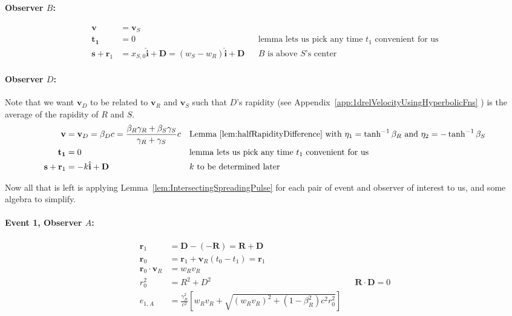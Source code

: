 \documentclass[a4paper]{article}
\theoremstyle{plain}
\theoremstyle{definition}
\newcommand{\vect}[1]{\mathbf{#1}}
\newcommand{\hatvec}[1]{\hat{\mathbf{#1}}}
\begin{document}
\paragraph{Observer $B$:}

\begin{align}
\vect{v} & = \vect{v}_S \\
\vect{t_1} & = 0 & & \text{lemma lets us pick any time $t_1$ convenient for us} \\
\vect{s} + \vect{r}_1 & = x_{S,0}\hatvec{i} + \vect{D} = (w_S - w_R)\hatvec{i} + \vect{D} & & \text{$B$ is above $S$'s center}
\end{align}


\paragraph{Observer $D$:}

Note that we want $\vect{v}_D$ to be related to $\vect{v}_R$ and
$\vect{v}_S$ such that $D$'s rapidity (see
Appendix~\ref{app:1drelVelocityUsingHyperbolicFns} ) is the average of
the rapidity of $R$ and $S$.
\begin{align}
\vect{v} & = \vect{v}_D = \beta_D c = \frac{\beta_R\gamma_R + \beta_S\gamma_S}{\gamma_R + \gamma_S} c & & \text{Lemma~\ref{lem:halfRapidityDifference} with $\eta_1 = \tanh^{-1}\beta_R$ and $\eta_2 = -\tanh^{-1}\beta_S$} \\
\vect{t_1} & = 0 & & \text{lemma lets us pick any time $t_1$ convenient for us} \\
\vect{s} + \vect{r}_1 & = -k\hatvec{i} + \vect{D} & & \text{$k$ to be determined later}
\end{align}

Now all that is left is applying
Lemma~\ref{lem:IntersectingSpreadingPulse} for each pair of event and
observer of interest to us, and some algebra to simplify.


\paragraph{Event 1, Observer $A$:}

\begin{align*}
\vect{r}_1 & = \vect{D} - (-\vect{R}) = \vect{R} + \vect{D} \\
\vect{r}_0 & = \vect{r}_1 + \vect{v}_R (t_0 - t_1) = \vect{r}_1 \\
\vect{r}_0 \cdot \vect{v}_R & = w_Rv_R \\
r_0^2 & = R^2 + D^2 & & \text{$\vect{R} \cdot \vect{D} = 0$} \\
e_{1,A} & = \frac{\gamma_R^2}{c^2} \left[ w_Rv_R + \sqrt{ (w_Rv_R)^2 + (1-\beta_R^2)c^2r_0^2 } \right]
\end{align*}
\end{document}
